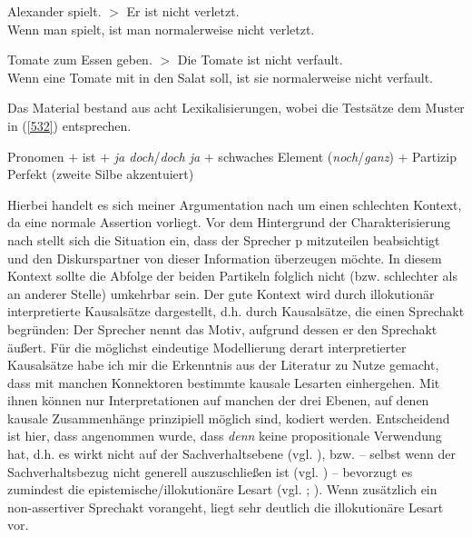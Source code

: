 \begin{exe}
	\ex\label{530}
	Alexander spielt. $>$ Er ist nicht verletzt.\\
	\glq Wenn man spielt, ist man normalerweise nicht verletzt.\grq {}
\end{exe}		
		
\begin{exe}
	\ex\label{531}
	Tomate zum Essen geben. $>$ Die Tomate ist nicht verfault.\\
	\glq Wenn eine Tomate mit in den Salat soll, ist sie normalerweise nicht verfault.\grq {}
\end{exe}
Das Material bestand aus acht Lexikalisierungen, wobei die Testsätze dem Muster in (\ref{532}) entsprechen.

\begin{exe}
	\ex\label{532}
	Pronomen $\plus$ ist $\plus$ \textit{ja doch}/\textit{doch ja} $\plus$ schwaches Element (\textit{noch}/\textit{ganz}) + 			Partizip Perfekt (zweite Silbe akzentuiert)
\end{exe}
Hierbei handelt es sich meiner Argumentation nach um einen \glq schlechten\grq {} Kontext, da eine normale Assertion vorliegt. Vor dem Hintergrund der Charakterisie\-rung nach \citet{Farkas2010} stellt sich die Situation ein, dass der Sprecher p mitzuteilen beabsichtigt und den Diskurspartner von dieser Information über\-zeugen möchte. In diesem Kontext sollte die Abfolge der beiden Partikeln folglich nicht (bzw. schlechter als an anderer Stelle) umkehrbar sein. Der \glq gute\grq {} Kontext wird durch illokutionär interpretierte Kausalsätze  dargestellt, d.h. durch Kausalsätze, die einen Sprechakt  begründen: Der Sprecher nennt das Motiv, aufgrund dessen er den Sprechakt äußert. Für die möglichst eindeutige Modellierung derart interpretierter Kausalsätze habe ich mir die Erkenntnis aus der Literatur zu Nutze gemacht, dass mit manchen Konnektoren bestimmte kausale Lesarten einhergehen. Mit ihnen können nur Interpretationen auf manchen der drei Ebenen, auf denen kausale Zusammenhänge prinzipiell möglich sind, kodiert werden. Entscheidend ist hier, dass angenommen wurde, dass \textit{denn} keine propositionale Verwendung hat, d.h. es wirkt nicht auf der Sachverhaltsebene (vgl. \citealt[320]{Volodina2010}), bzw. – selbst wenn der Sachverhaltsbezug nicht generell auszuschließen ist (vgl. \citealt[141]{Schmidhauser1995}) – bevorzugt es zumindest die   epistemische/illokutionäre Lesart (vgl. \citealt[270]{Bluehdorn2006}; \citeyear[29]{Bluehdorn2008}). Wenn zusätzlich ein non-assertiver Sprechakt vorangeht, liegt sehr deutlich die illokutionäre Lesart vor.

